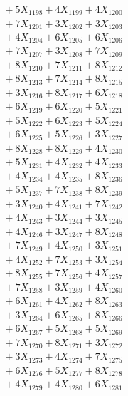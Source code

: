 \documentclass[a4paper,10pt]{article}
\begin{document}
{\begin{align}
&\;  + 5 X_{1198} + 4 X_{1199} + 4 X_{1200} \\[0.3ex]
&\;  + 7 X_{1201} + 3 X_{1202} + 3 X_{1203} \\[0.3ex]
&\;  + 4 X_{1204} + 6 X_{1205} + 6 X_{1206} \\[0.3ex]
&\;  + 7 X_{1207} + 3 X_{1208} + 7 X_{1209} \\[0.5ex]\allowbreak
&\;  + 8 X_{1210} + 7 X_{1211} + 8 X_{1212} \\[0.3ex]
&\;  + 8 X_{1213} + 7 X_{1214} + 8 X_{1215} \\[0.3ex]
&\;  + 3 X_{1216} + 8 X_{1217} + 6 X_{1218} \\[0.3ex]
&\;  + 6 X_{1219} + 6 X_{1220} + 5 X_{1221} \\[0.3ex]
&\;  + 5 X_{1222} + 6 X_{1223} + 5 X_{1224} \\[0.3ex]
&\;  + 6 X_{1225} + 5 X_{1226} + 3 X_{1227} \\[0.3ex]
&\;  + 8 X_{1228} + 8 X_{1229} + 4 X_{1230} \\[0.3ex]
&\;  + 5 X_{1231} + 4 X_{1232} + 4 X_{1233} \\[0.3ex]
&\;  + 4 X_{1234} + 4 X_{1235} + 8 X_{1236} \\[0.3ex]
&\;  + 5 X_{1237} + 7 X_{1238} + 8 X_{1239} \\[0.5ex]\allowbreak
&\;  + 3 X_{1240} + 4 X_{1241} + 7 X_{1242} \\[0.3ex]
&\;  + 4 X_{1243} + 3 X_{1244} + 3 X_{1245} \\[0.3ex]
&\;  + 4 X_{1246} + 3 X_{1247} + 8 X_{1248} \\[0.3ex]
&\;  + 7 X_{1249} + 4 X_{1250} + 3 X_{1251} \\[0.3ex]
&\;  + 4 X_{1252} + 7 X_{1253} + 3 X_{1254} \\[0.3ex]
&\;  + 8 X_{1255} + 7 X_{1256} + 4 X_{1257} \\[0.3ex]
&\;  + 7 X_{1258} + 3 X_{1259} + 4 X_{1260} \\[0.3ex]
&\;  + 6 X_{1261} + 4 X_{1262} + 8 X_{1263} \\[0.3ex]
&\;  + 3 X_{1264} + 6 X_{1265} + 8 X_{1266} \\[0.3ex]
&\;  + 6 X_{1267} + 5 X_{1268} + 5 X_{1269} \\[0.5ex]\allowbreak
&\;  + 7 X_{1270} + 8 X_{1271} + 3 X_{1272} \\[0.3ex]
&\;  + 3 X_{1273} + 4 X_{1274} + 7 X_{1275} \\[0.3ex]
&\;  + 6 X_{1276} + 5 X_{1277} + 8 X_{1278} \\[0.3ex]
&\;  + 4 X_{1279} + 4 X_{1280} + 6 X_{1281} \\[0.3ex]

\end{align}}
\end{document}
